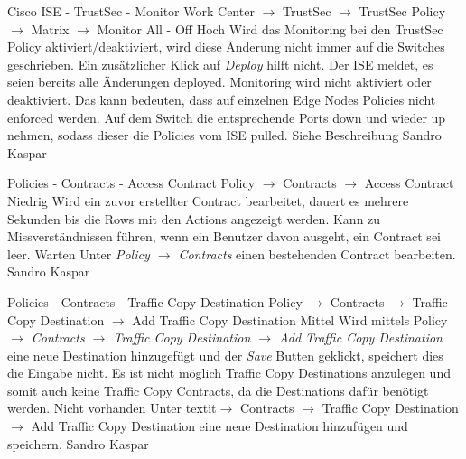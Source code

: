 \bugreport
{Cisco ISE - TrustSec - Monitor}
{Work Center $\rightarrow$ TrustSec $\rightarrow$ TrustSec Policy $\rightarrow$ Matrix $\rightarrow$ Monitor All - Off}
{Hoch}
{Wird das Monitoring bei den TrustSec Policy aktiviert/deaktiviert, wird diese Änderung nicht immer auf die Switches geschrieben. Ein zusätzlicher Klick auf \textit{Deploy} hilft nicht. Der ISE meldet, es seien bereits alle Änderungen deployed.}
{Monitoring wird nicht aktiviert oder deaktiviert. Das kann bedeuten, dass auf einzelnen Edge Nodes Policies nicht enforced werden.}
{Auf dem Switch die entsprechende Ports down und wieder up nehmen, sodass dieser die Policies vom ISE pulled.}
{
	Siehe Beschreibung
}
{Sandro Kaspar}
{}


\bugreport
{Policies - Contracts - Access Contract}
{Policy $\rightarrow$ Contracts $\rightarrow$ Access Contract}
{Niedrig}
{Wird ein zuvor erstellter Contract bearbeitet, dauert es mehrere Sekunden bis die Rows mit den Actions angezeigt werden.}
{Kann zu Missverständnissen führen, wenn ein Benutzer davon ausgeht, ein Contract sei leer.}
{Warten}
{Unter \textit{Policy $\rightarrow$ Contracts} einen bestehenden Contract bearbeiten.}
{Sandro Kaspar}
{}
	

\bugreport
{Policies - Contracts - Traffic Copy Destination}
{Policy $\rightarrow$ Contracts $\rightarrow$ Traffic Copy Destination $\rightarrow$ Add Traffic Copy Destination}
{Mittel}
{Wird mittels Policy \textit{$\rightarrow$ Contracts $\rightarrow$ Traffic Copy Destination $\rightarrow$ Add Traffic Copy Destination} eine neue Destination hinzugefügt und der \textit{Save} Butten geklickt, speichert dies die Eingabe nicht.}
{Es ist nicht möglich Traffic Copy Destinations anzulegen und somit auch keine Traffic Copy Contracts, da die Destinations dafür benötigt werden.}
{Nicht vorhanden}
{Unter textit{$\rightarrow$ Contracts $\rightarrow$ Traffic Copy Destination $\rightarrow$ Add Traffic Copy Destination} eine neue Destination hinzufügen und speichern.}
{Sandro Kaspar}
{}







